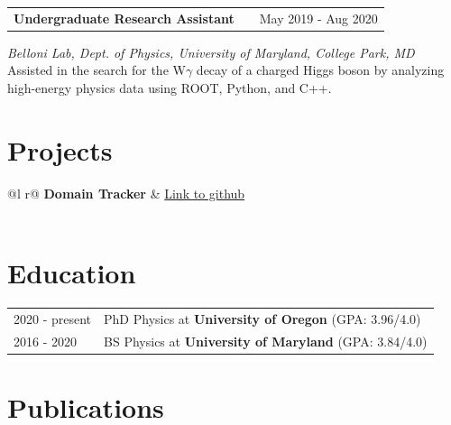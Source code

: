 \documentclass[a4paper,12pt]{article}
\makeatletter
\newenvironment{jobshort}[2]
    {
    \begin{tabularx}{\linewidth}{@{}l X r@{}}
    \textbf{#1} & \hfill &  #2 \\[3.75pt]
    \end{tabularx}
    }
    {
    }
\makeatother
\begin{document}
\begin{jobshort}{Undergraduate Research Assistant}{May 2019 - Aug 2020}
\textit{Belloni Lab, Dept. of Physics, University of Maryland, College Park, MD} \newline
Assisted in the search for the W$\gamma$ decay of a charged Higgs boson by analyzing high-energy physics data using ROOT, Python, and C++.
\end{jobshort}
  
\section{Projects}

\begin{tabularx}{\linewidth}{ @{}l r@{} }
\textbf{Domain Tracker} & \hfill \href{https://github.com/jareddi/domain-tracker}{Link to github} \\[3.75pt]
  \\
\end{tabularx}

\section{Education}
\begin{tabularx}{\linewidth}{@{}l X@{}}	
2020 - present & PhD Physics at \textbf{University of Oregon} \hfill \normalsize (GPA: 3.96/4.0) \\

2016 - 2020 & BS Physics at \textbf{University of Maryland} \hfill (GPA: 3.84/4.0) \\ 
\end{tabularx}

\section{Publications}
\begin{refsection}[cv.bib]
\nocite{*}
\newrefcontext[sorting=ydnt] %
\printbibliography[heading=none]
\end{refsection}
\end{document}
